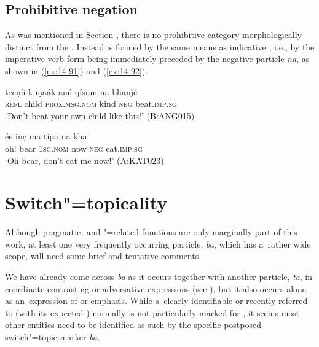 \subsection{Prohibitive negation}
\label{subsec:14-3-5}


As was mentioned in Section , there is no prohibitive category morphologically distinct from the . Instead  is formed by the same means as indicative , i.e., by the imperative verb form being immediately preceded by the negative particle \textit{na}, as shown in (\ref{ex:14-91}) and (\ref{ex:14-92}).

\begin{exe}
\ex
\label{ex:14-91}
\gll teeṇíi kuṇaák anú qísum na bhanǰé \\
\textsc{refl} child \textsc{prox.msg.nom} kind \textsc{neg} beat.\textsc{imp.sg}  \\
\glt `Don't beat your own child like this!' (B:ANG015)

\ex
\label{ex:14-92}
\gll ée iṇc̣ ma típa na kha \\
oh! bear \textsc{1sg.nom} now \textsc{neg} eat.\textsc{imp.sg } \\
\glt `Oh bear, don't eat me now!' (A:KAT023)
\end{exe}

\section{Switch"=topicality}
\label{sec:14-4}


Although pragmatic- and "=related functions are only marginally part of this work, at least one very frequently occurring particle, \textit{ba}, which has a~rather wide scope, will need some brief and tentative comments.



We have already come across \textit{ba} as it occurs together with another particle, \textit{ta}, in coordinate contrasting or adversative expressions (see ), but it also occurs alone as an~expression of  or emphasis. While a~clearly identifiable or recently referred to  (with its expected ) normally is not particularly marked for , it seems most other entities need to be identified as such by the specific postposed switch"=topic \citep[149]{andrews2007} marker \textit{ba}.



